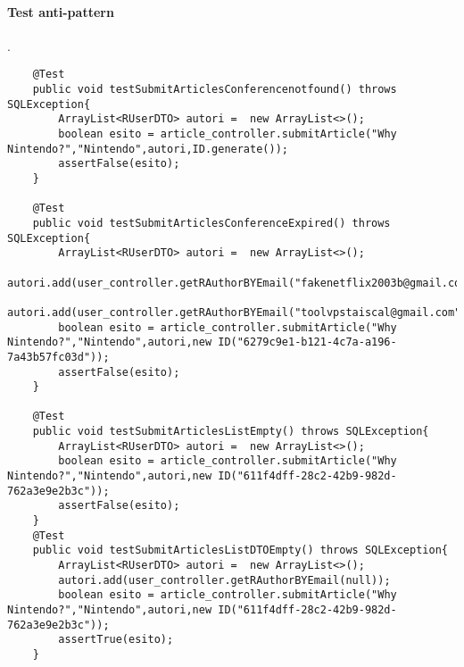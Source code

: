 \paragraph{Test anti-pattern}
.
\begin{lstlisting}
    @Test
    public void testSubmitArticlesConferencenotfound() throws SQLException{
        ArrayList<RUserDTO> autori =  new ArrayList<>();
        boolean esito = article_controller.submitArticle("Why Nintendo?","Nintendo",autori,ID.generate());
        assertFalse(esito);
    }

    @Test
    public void testSubmitArticlesConferenceExpired() throws SQLException{
        ArrayList<RUserDTO> autori =  new ArrayList<>();
        autori.add(user_controller.getRAuthorBYEmail("fakenetflix2003b@gmail.com"));
        autori.add(user_controller.getRAuthorBYEmail("toolvpstaiscal@gmail.com"));
        boolean esito = article_controller.submitArticle("Why Nintendo?","Nintendo",autori,new ID("6279c9e1-b121-4c7a-a196-7a43b57fc03d"));
        assertFalse(esito);
    }

    @Test
    public void testSubmitArticlesListEmpty() throws SQLException{
        ArrayList<RUserDTO> autori =  new ArrayList<>();
        boolean esito = article_controller.submitArticle("Why Nintendo?","Nintendo",autori,new ID("611f4dff-28c2-42b9-982d-762a3e9e2b3c"));
        assertFalse(esito);
    }
    @Test
    public void testSubmitArticlesListDTOEmpty() throws SQLException{
        ArrayList<RUserDTO> autori =  new ArrayList<>();
        autori.add(user_controller.getRAuthorBYEmail(null));
        boolean esito = article_controller.submitArticle("Why Nintendo?","Nintendo",autori,new ID("611f4dff-28c2-42b9-982d-762a3e9e2b3c"));
        assertTrue(esito);
    }
\end{lstlisting}
